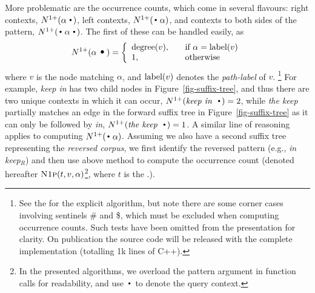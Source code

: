 More problematic are the occurrence counts, which come in several
flavours: right contexts, $\nlplus{\patdot}$,
left contexts,  $\nlplus{\dotpat}$, and contexts to both sides of the pattern,
$\nlplus{\dotpatdot}$. 
The first of these can be handled easily, as 
\begin{equation*}
\nlplus{\patdot} = \left\{ 
\begin{array}{ll}
   \degree{t}{v}, \quad & \text{if~} \alpha = \pathlabel{t}{v} \\
   1, & \text{otherwise}
\end{array} \right.
\end{equation*}
where $v$ is the node matching $\alpha$, and 
$\pathlabel{t}{v}$ denotes the  {\it path-label} of $v$.%
\footnote{See the \supp for the explicit algorithm, but note there are some corner cases involving sentinels \#
  and \$, which must be excluded when computing occurrence counts.
  Such tests have been omitted from the presentation for clarity. On publication the
  source code will be released with the complete implementation (totalling 1k lines of C++).}
For example, \emph{keep in} has two child nodes in  Figure~\ref{fig-suffix-tree},
and thus there are two unique contexts in which it can occur, $\nlplus{\emph{keep in~}\Bigcdot}=2$,
while \emph{the keep} partially matches an edge in the forward suffix tree in
Figure~\ref{fig-suffix-tree} as it can only be followed by \emph{in}, $\nlplus{\emph{the keep~}\Bigcdot}=1$.
A similar line of reasoning applies to computing $\nlplus{\dotpat}$. 
Assuming we also have a second suffix tree representing the \emph{reversed corpus}, 
we first identify the reversed pattern (e.g., \emph{in keep}$_R$) and then use above method to compute the 
occurrence count (denoted hereafter $\nlplusfunc{t}{v}{\alpha}$\footnote{In the presented algorithms, we overload the pattern argument in function calls for 
readability, and use $\Bigcdot$ to denote the query context.}, where $t$ is the \CST.). 

